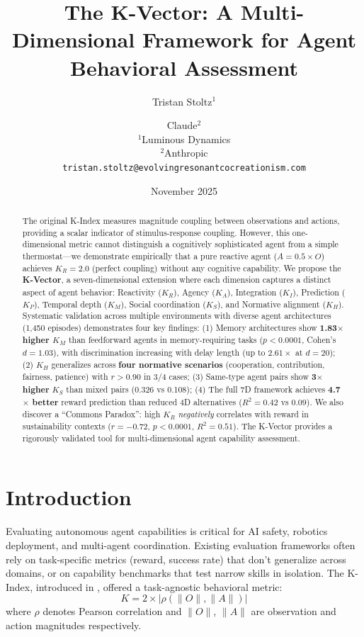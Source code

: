 \documentclass[11pt,a4paper]{article}
\title{The K-Vector: A Multi-Dimensional Framework for Agent Behavioral Assessment}
\author{%
  Tristan Stoltz$^{1}$ \and Claude$^{2}$\\[1ex]
  \small $^{1}$Luminous Dynamics\\
  \small $^{2}$Anthropic\\[1ex]
  \small \texttt{tristan.stoltz@evolvingresonantcocreationism.com}
}
\date{November 2025}
\begin{document}
\maketitle

\begin{abstract}
The original K-Index measures magnitude coupling between observations and actions, providing a scalar indicator of stimulus-response coupling. However, this one-dimensional metric cannot distinguish a cognitively sophisticated agent from a simple thermostat---we demonstrate empirically that a pure reactive agent ($A = 0.5 \times O$) achieves $K_R = 2.0$ (perfect coupling) without any cognitive capability. We propose the \textbf{K-Vector}, a seven-dimensional extension where each dimension captures a distinct aspect of agent behavior: Reactivity ($K_R$), Agency ($K_A$), Integration ($K_I$), Prediction ($K_P$), Temporal depth ($K_M$), Social coordination ($K_S$), and Normative alignment ($K_H$). Systematic validation across multiple environments with diverse agent architectures (1,450 episodes) demonstrates four key findings: (1) Memory architectures show \textbf{1.83$\times$ higher $K_M$} than feedforward agents in memory-requiring tasks ($p < 0.0001$, Cohen's $d = 1.03$), with discrimination increasing with delay length (up to $2.61\times$ at $d=20$); (2) $K_H$ generalizes across \textbf{four normative scenarios} (cooperation, contribution, fairness, patience) with $r > 0.90$ in 3/4 cases; (3) Same-type agent pairs show \textbf{3$\times$ higher} $K_S$ than mixed pairs (0.326 vs 0.108); (4) The full 7D framework achieves \textbf{4.7$\times$ better} reward prediction than reduced 4D alternatives ($R^2 = 0.42$ vs $0.09$). We also discover a ``Commons Paradox'': high $K_R$ \emph{negatively} correlates with reward in sustainability contexts ($r = -0.72$, $p < 0.0001$, $R^2 = 0.51$). The K-Vector provides a rigorously validated tool for multi-dimensional agent capability assessment.
\end{abstract}

\section{Introduction}

Evaluating autonomous agent capabilities is critical for AI safety, robotics deployment, and multi-agent coordination. Existing evaluation frameworks often rely on task-specific metrics (reward, success rate) that don't generalize across domains, or on capability benchmarks that test narrow skills in isolation. The K-Index, introduced in \citet{paper6}, offered a task-agnostic behavioral metric:
\begin{equation}
K = 2 \times |\rho(\|O\|, \|A\|)|
\end{equation}
where $\rho$ denotes Pearson correlation and $\|O\|$, $\|A\|$ are observation and action magnitudes respectively.
\end{document}
